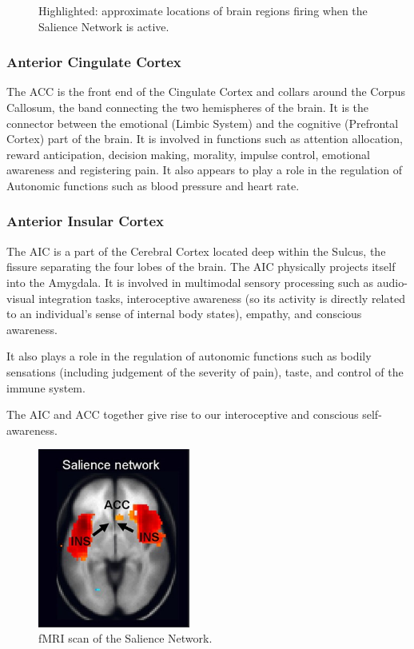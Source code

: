\documentclass[a4paper, amsfonts, amssymb, amsmath, reprint, showkeys, nofootinbib, twoside]{revtex4-1}
\begin{document}
\begin{figure}[h!]
\begin{subfigure}[b]{0.48\linewidth}
  \end{subfigure}
  \caption{Highlighted: approximate locations of brain regions firing when the Salience Network is active.}
  \label{fig:sn}
\end{figure}

\subsubsection{Anterior Cingulate Cortex}

The ACC is the front end of the Cingulate Cortex and collars around the Corpus
Callosum, the band connecting the two hemispheres of the brain. It is the connector
between the emotional (Limbic System) and the cognitive (Prefrontal Cortex) part of
the brain. It is involved in functions such as attention allocation, reward
anticipation, decision making, morality, impulse control, emotional awareness and
registering pain. \cite{accstroop,accreward,snmorality,empathypain,acccognitive} It
also appears to play a role in the regulation of Autonomic functions such as blood
pressure and heart rate. \cite{accbloodpressure}

\subsubsection{Anterior Insular Cortex}

The AIC is a part of the Cerebral Cortex located deep within the Sulcus, the
fissure separating the four lobes of the brain. The AIC physically projects itself
into the Amygdala. It is involved in multimodal sensory processing such as
audio-visual integration tasks, interoceptive awareness (so its activity is directly
related to an individual's sense of internal body states), empathy, and conscious
awareness. \cite{aicemotion}

It also plays a role in the regulation of autonomic functions such as bodily
sensations (including judgement of the severity of pain), taste, and control of the
immune system. \cite{aicautonomic}

The AIC and ACC together give rise to our interoceptive and conscious
self-awareness.  \cite{selfaware}

\begin{figure}[H]
  \centering
  \includegraphics[width=5cm]{images/fmri-sn.jpg}
  \caption{fMRI scan of the Salience Network.}
  \label{fig:fmri-sn}
\end{figure}
\end{document}
